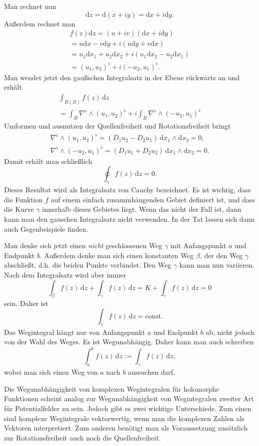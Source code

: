 \documentclass[a4paper,10pt,fleqn,twocolumn,twoside]{article}
\begin{document}
Man rechnet nun
\[\mathrm dz = \mathrm d(x+iy) = \mathrm dx+i\mathrm dy.\]
Außerdem rechnet man
\begin{gather*}
f(z)\mathrm dz = (u+iv)(\mathrm dx+i\mathrm dy)\\
= u\mathrm dx-v\mathrm dy+i(u\mathrm dy+v\mathrm dx)\\
= u_1\mathrm dx_1+u_2\mathrm dx_2+i(u_1\mathrm dx_2-u_2\mathrm dx_1)\\
= (u_1,u_2)^\flat + i(-u_2,u_1)^\flat.
\end{gather*}
Man wendet jetzt den gaußschen Integralsatz in der Ebene rückwärts an
und erhält
\begin{gather*}
\int_{R(B)} f(z)\,\mathrm dz\\
= \int_B \nabla^\flat\wedge (u_1,u_2)^\flat
+ i\int_B \nabla^\flat\wedge (-u_2,u_1)^\flat
\end{gather*}
Umformen und ausnutzen der Quellenfreiheit
und Rotationsfreiheit bringt
\begin{gather*}
\nabla^\flat\wedge (u_1,u_2)^\flat
= (D_1u_2-D_2u_1)\,\mathrm dx_1\wedge\mathrm dx_2= 0,\\
\nabla^\flat\wedge (-u_2,u_1)^\flat = (D_1u_1+D_2u_2)\,
\mathrm dx_1\wedge\mathrm dx_2 = 0.
\end{gather*}
Damit erhält man schließlich
\[\oint_\gamma f(z)\,\mathrm dz = 0.\]
Dieses Resultat wird als Integralsatz von Cauchy bezeichnet.
Es ist wichtig, dass die Funktion \(f\) auf einem einfach
zusammhängenden Gebiet definiert ist, und dass die Kurve \(\gamma\)
innerhalb dieses Gebietes liegt. Wenn das nicht der Fall ist, dann
kann man den gauschen Integralsatz nicht verwenden. In der Tat lassen
sich dann auch Gegenbeispiele finden.

Man denke sich jetzt einen \textit{nicht} geschlossenen Weg \(\gamma\)
mit Anfangspunkt \(a\) und Endpunkt \(b\). Außerdem denke man sich
einen konstanten Weg \(\beta\), der den Weg \(\gamma\)
abschließt, d.h. die beiden Punkte verbindet. Den Weg \(\gamma\)
kann man nun variieren. Nach dem Integralsatz wird aber immer
\[\int_{\beta} f(z)\,\mathrm dz+\int_\gamma f(z)\,\mathrm dz
=K+\int_\gamma f(z)\,\mathrm dz=0\]
sein. Daher ist
\[\int_\gamma f(z)\,\mathrm dz=\mathrm{const}.\]
Das Wegintegral hängt nur von Anfangspunkt \(a\) und Endpunkt \(b\)
ab, nicht jedoch von der Wahl des Weges. Es ist Wegunabhängig. Daher
kann man auch schreiben
\[\int_a^b f(z)\,\mathrm dz:=\int_\gamma f(z)\,\mathrm dz,\]
wobei man sich einen Weg von \(a\) nach \(b\) aussuchen darf.

Die Wegunabhängigkeit von komplexen Wegintegralen für holomorphe
Funktionen scheint analog zur Wegunabhängigkeit von Wegintegralen
zweiter Art für Potentialfelder zu sein. Jedoch gibt es zwei wichtige
Unterschiede. Zum einen sind komplexe Wegintegrale vektorwertig, wenn
man die komplexen Zahlen als Vektoren interpretiert. Zum anderen
benötigt man als Voraussetzung zusätzlich zur Rotationsfreiheit
auch noch die Quellenfreiheit.
\end{document}
